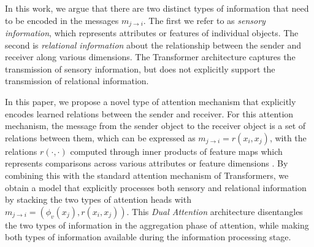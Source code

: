 
In this work, we argue that there are two distinct types of information that need to be encoded in the messages $m_{j \to i}$. The first we refer to as \textit{sensory information}, which represents attributes or features of individual objects. The second is \textit{relational information} about the relationship between the sender and receiver along various dimensions.
The Transformer architecture captures the transmission of sensory information, but does not explicitly support the transmission of relational information.



In this paper, we propose a novel type of attention mechanism that explicitly encodes learned relations between the sender and receiver. For this attention mechanism, the message from the sender object to the receiver object is a set of relations between them, which can be expressed as $m_{j \to i} = r(x_i, x_j)$, with the relations $r(\cdot,\cdot)$ computed through inner products of feature maps which represents comparisons across various attributes or feature dimensions . By combining this with the standard attention mechanism of Transformers, we obtain a model that explicitly processes both sensory and relational information by stacking the two types of attention heads with $m_{j \to i} = (\phi_v(x_j), r(x_i, x_j))$. This \textit{Dual Attention} architecture disentangles the two types of information in the aggregation phase of attention, while making both types of information available during the information processing stage.




